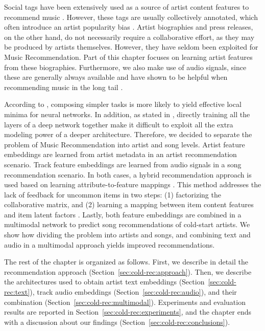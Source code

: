 Social tags have been extensively used as a source of artist content features to recommend music \citep{Knees2013}. However, these tags are usually collectively annotated, which often introduce an artist popularity bias \citep{Turnbull2008}.
Artist biographies and press releases, on the other hand, do not necessarily require a collaborative effort, as they may be produced by artists themselves. 
However, they have seldom been exploited for Music Recommendation.
Part of this chapter focuses on learning artist features from these biographies.
Furthermore, we also make use of audio signals, since these are generally always available and have shown to be helpful when recommending music in the long tail \citep{Oord2013}.

According to \cite{gulccehre2016knowledge}, composing simpler tasks is more likely to yield effective local minima for neural networks. In addition, as stated in \cite{larochelle2009exploring}, directly training all the layers of a deep network together make it difficult to exploit all the extra modeling power of a deeper architecture. 
Therefore, we decided to separate the problem of Music Recommendation into artist and song levels.
Artist feature embeddings are learned from artist metadata in an artist recommendation scenario.
Track feature embeddings are learned from audio signals in a song recommendation scenario.
In both cases, a hybrid recommendation approach is used based on learning attribute-to-feature mappings \citep{GantnerDFRS10}.
This method addresses the lack of feedback for uncommon items in two steps: (1) factorizing the collaborative matrix, and (2) learning a mapping between item content features and item latent factors \citep{Oord2013,Bansal2016}.
Lastly, both feature embeddings are combined in a multimodal network to predict song recommendations of cold-start artists.
We show how dividing the problem into artists and songs, and combining text and audio in a multimodal approach yields improved recommendations.

The rest of the chapter is organized as follows. First, we describe in detail the recommendation approach (Section~\ref{sec:cold-rec:approach}). Then, we describe the architectures used to obtain artist text embeddings (Section~\ref{sec:cold-rec:text}), track audio embeddings (Section~\ref{sec:cold-rec:audio}), and their combination (Section~\ref{sec:cold-rec:multimodal}). Experiments and evaluation results are reported in Section~\ref{sec:cold-rec:experiments}, and the chapter ends with a discussion about our findings (Section~\ref{sec:cold-rec:conclusions}).


